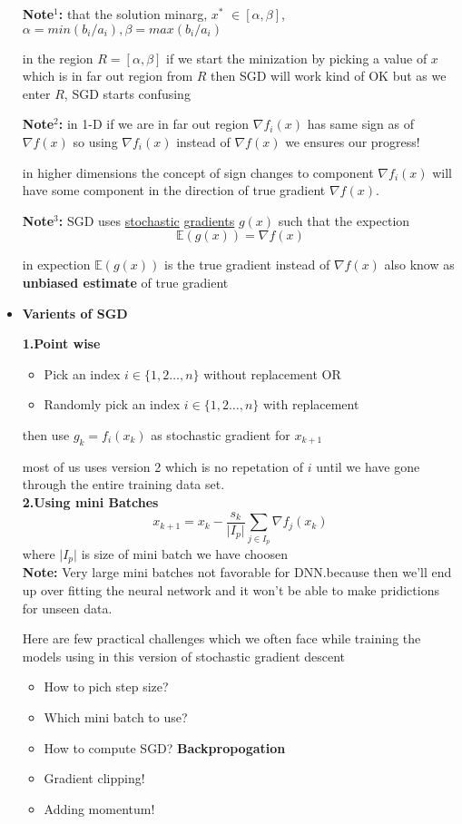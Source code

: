 \documentclass[a4paper]{article}
\numberwithin{equation}{section}
\begin{document}
\begin{itemize}
\textbf{Note$^1$:} that the solution minarg, $x^*$ $\in[\alpha,\beta]$, $\alpha=min(b_i/a_i),\beta=max(b_i/a_i)$ 

in the region $R=[\alpha,\beta]$ if we start the minization by picking a value of $x$ which is in far out region from $R$ then SGD will work kind of OK but as we enter $R$, SGD starts confusing 

\textbf{Note$^2$:} in 1-D if we are in far out region $\nabla f_i(x)$ has same sign as of $\nabla f(x)$ so using $\nabla f_i(x)$ instead of $\nabla f(x)$ we ensures our progress!

in higher dimensions the concept of sign changes to component $\nabla f_i(x)$ will have some component in the direction of true gradient $\nabla f(x)$.

\textbf{Note$^3$:} SGD uses \underline{stochastic} g\underline{radients} $g(x)$ such that the expection
\[\mathbb{E}(g(x))=\nabla f(x)\]

in expection $\mathbb{E}(g(x))$ is the true gradient instead of $\nabla f(x)$ also know as \textbf{unbiased estimate} of true gradient
\item \textbf{Varients of SGD}

\textbf{1.Point wise}
\begin{itemize}
    \item Pick an index $i \in \{1,2\dots,n\}$ without replacement OR
    \item Randomly pick an index $i \in \{1,2\dots,n\}$ with replacement
\end{itemize}
then use $g_k=f_i(x_k)$ as stochastic gradient for $x_{k+1}$

most of us uses version 2 which is no repetation of $i$ until we have gone through the entire training data set.\\
    
\textbf{2.Using mini Batches}
\[x_{k+1}=x_k- \frac{s_k}{\vert I_p \vert} \sum_{j \in I_p}^{}\nabla f_j(x_k)\]
where $\vert I_p \vert$ is size of mini batch we have choosen\\ 

\textbf{Note:} Very large mini batches not favorable for DNN.because then we'll end up over fitting the neural network and it won't be able to make pridictions for unseen data.

Here are few practical challenges which we often face while training the models using in this version of stochastic gradient descent
\begin{itemize}
    \item How to pich step size?
    \item Which mini batch to use?
    \item How to compute SGD? \textbf{Backpropogation}
    \item Gradient clipping!
    \item Adding momentum!
\end{itemize}


\end{itemize}
\end{document}
